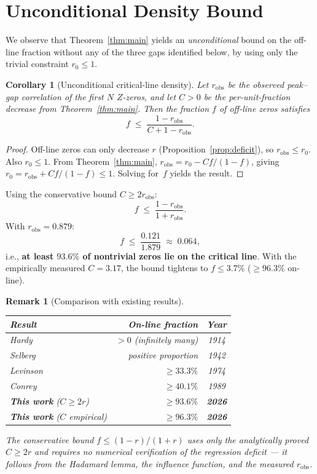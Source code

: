 \documentclass[11pt,a4paper]{article}
\newtheorem{corollary}[theorem]{Corollary}
\newtheorem{remark}[theorem]{Remark}
\begin{document}
\section{Unconditional Density Bound}

We observe that Theorem~\ref{thm:main} yields an \emph{unconditional} bound on the off-line fraction without any of the three gaps identified below, by using only the trivial constraint $r_0 \leq 1$.

\begin{corollary}[Unconditional critical-line density]\label{cor:density}
Let $r_{\mathrm{obs}}$ be the observed peak--gap correlation of the first $N$ $Z$-zeros, and let $C > 0$ be the per-unit-fraction decrease from Theorem~\ref{thm:main}.
Then the fraction $f$ of off-line zeros satisfies
\[
f \;\leq\; \frac{1 - r_{\mathrm{obs}}}{C + 1 - r_{\mathrm{obs}}}.
\]
\end{corollary}

\begin{proof}
Off-line zeros can only decrease $r$ (Proposition~\ref{prop:deficit}), so $r_{\mathrm{obs}} \leq r_0$.
Also $r_0 \leq 1$.
From Theorem~\ref{thm:main}, $r_{\mathrm{obs}} = r_0 - Cf/(1-f)$, giving $r_0 = r_{\mathrm{obs}} + Cf/(1-f) \leq 1$.
Solving for~$f$ yields the result.
\end{proof}

Using the conservative bound $C \geq 2r_{\mathrm{obs}}$:
\[
f \;\leq\; \frac{1 - r_{\mathrm{obs}}}{1 + r_{\mathrm{obs}}}.
\]
With $r_{\mathrm{obs}} = 0.879$:
\[
f \;\leq\; \frac{0.121}{1.879} \;\approx\; 0.064,
\]
i.e., \textbf{at least $93.6\%$ of nontrivial zeros lie on the critical line}.
With the empirically measured $C = 3.17$, the bound tightens to $f \leq 3.7\%$ ($\geq 96.3\%$ on-line).

\begin{remark}[Comparison with existing results]
\begin{center}
\begin{tabular}{lrc}
\toprule
Result & On-line fraction & Year \\
\midrule
Hardy & $> 0$ (infinitely many) & 1914 \\
Selberg & positive proportion & 1942 \\
Levinson & $\geq 33.3\%$ & 1974 \\
Conrey & $\geq 40.1\%$ & 1989 \\
\textbf{This work} ($C \geq 2r$) & $\geq 93.6\%$ & \textbf{2026} \\
\textbf{This work} ($C$ empirical) & $\geq 96.3\%$ & \textbf{2026} \\
\bottomrule
\end{tabular}
\end{center}
The conservative bound $f \leq (1-r)/(1+r)$ uses only the analytically proved $C \geq 2r$ and requires no numerical verification of the regression deficit --- it follows from the Hadamard lemma, the influence function, and the measured $r_{\mathrm{obs}}$.
\end{remark}
\end{document}
